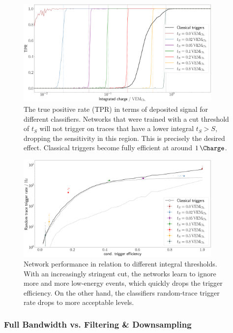 \begin{figure}
	\centering
	\includegraphics[width=0.9\textwidth]{./plots/CNN_charge_TPR.png}
	\caption{The true positive rate (TPR) in terms of deposited signal for different classifiers. Networks that were trained with a cut threshold of $t_S$ will not
	trigger on traces that have a lower integral $t_S > S$, dropping the sensitivity in this region. This is precisely the desired effect. Classical triggers 
	become fully efficient at around $\SI{1}{\Charge}$.}
	\label{fig:CNN-charge-tpr}
\end{figure}

\begin{figure}
	\centering
	\includegraphics[width=0.9\textwidth]{./plots/CNN_charge_cut.png}
	\caption{Network performance in relation to different integral thresholds. With an increasingly stringent cut, the networks learn to ignore more and more
	low-energy events, which quickly drops the trigger efficiency. On the other hand, the classifiers random-trace trigger rate drops to more acceptable levels.}
	\label{fig:CNN-charge-cut}
\end{figure}

\subsubsection{Full Bandwidth vs. Filtering \& Downsampling}
\label{sssec:full-bandwidth-filtering-downsampling}


